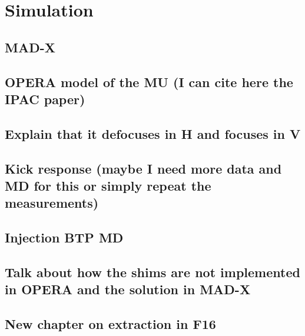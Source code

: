 \section{Simulation}
\label{section:simulation}

\subsection{MAD-X}

\subsection{OPERA model of the MU (I can cite here the IPAC paper)}

\subsection{Explain that it defocuses in H and focuses in V}

\cite{johnson_beam_2022}

\subsection{Kick response (maybe I need more data and MD for this or simply repeat the measurements)}

\subsection{Injection BTP MD}

\subsection{Talk about how the shims are not implemented in OPERA and the solution in MAD-X}

\subsection{New chapter on extraction in F16}